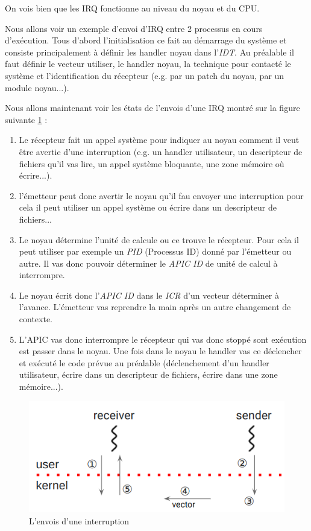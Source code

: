 On vois bien que les IRQ fonctionne au niveau du noyau et du CPU.

Nous allons voir un exemple d'envoi d'IRQ entre 2 processus en cours d'exécution.
Tous d'abord l'initialisation ce fait au démarrage du système et consiste principalement à définir les handler noyau dans l'\emph{IDT}.
Au préalable il faut définir le vecteur utiliser, le handler noyau, la technique pour contacté le système et l'identification du récepteur (e.g. par un patch du noyau, par un module noyau...).

Nous allons maintenant voir les états de l'envois d'une IRQ montré sur la figure suivante \ref{fig:sendInt} :

\begin{enumerate}[label=\protect\circled{\arabic*}]
  \item Le récepteur fait un appel système pour indiquer au noyau comment il veut être avertie d'une interruption (e.g. un handler utilisateur, un descripteur de fichiers qu'il vas lire, un appel système bloquante, une zone mémoire où écrire...).
  \item l'émetteur peut donc avertir le noyau qu'il fau envoyer une interruption pour cela il peut utiliser un appel système ou écrire dans un descripteur de fichiers...
  \item Le noyau détermine l'unité de calcule ou ce trouve le récepteur. Pour cela il peut utiliser par exemple un \emph{PID} (Processus ID) donné par l'émetteur ou autre.
  Il vas donc pouvoir déterminer le \emph{APIC ID} de unité de calcul à interrompre.
  \item Le noyau écrit donc l'\emph{APIC ID} dans le \emph{ICR} d'un vecteur déterminer à l'avance. L'émetteur vas reprendre la main après un autre changement de contexte.
  \item L'APIC vas donc interrompre le récepteur qui vas donc stoppé sont exécution est passer dans le noyau.
  Une fois dans le noyau le handler vas ce déclencher et exécuté le code prévue au préalable (déclenchement d'un handler utilisateur, écrire dans un descripteur de fichiers, écrire dans une zone mémoire...).
\end{enumerate}

\begin{figure}[H]
  \includegraphics[width=\textwidth]{images/interruptSend.png}
  \caption{L'envois d'une interruption}
  \label{fig:sendInt}
\end{figure}

